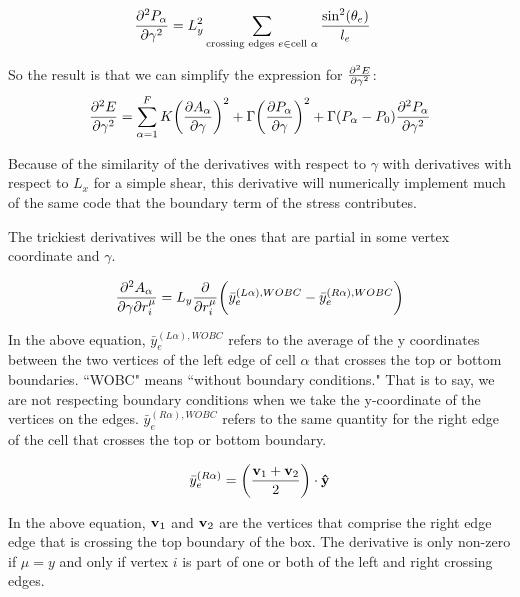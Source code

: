 \documentclass[12pt,a4paper]{article}
\begin{document}
\begin{align}
	\label{eqn: dPdgammadgamma}
	\pdv[2]{P_\alpha}{\gamma} &= L_y^2 \sum\limits_{ \text{crossing edges } e \in \text{cell } \alpha} \frac{\sin^2(\theta_{e})}{l_e}
\end{align}

So the result is that we can simplify the expression for $\pdv[2]{E}{\gamma}$:
\begin{align}
	\label{eqn: dedgammadgamma_simplified}
	\pdv[2]{E}{\gamma} &= \sum\limits_{\alpha=1}^{F}K \bigg(\pdv{A_\alpha}{\gamma}\bigg)^2  + \Gamma \bigg(\pdv{P_\alpha}{\gamma}\bigg)^2 + \Gamma (P_\alpha - P_0)  \pdv[2]{P_{\alpha}}{\gamma} \\
\end{align}

Because of the similarity of the derivatives with respect to $\gamma$ with derivatives with respect to $L_x$ for a simple shear, this derivative will numerically implement much of the same code that the boundary term of the stress contributes. 

The trickiest derivatives will be the ones that are partial in some vertex coordinate and $\gamma$. 

\begin{align}
	\label{eqn: dedgammadr}
	\pdv{A_{\alpha}}{\gamma}{r_i^\mu} = L_y \pdv{r_i^\mu}\bigg(\bar{y}_e^{(L\alpha), WOBC} - \bar{y}_e^{(R\alpha), WOBC}\bigg)
\end{align}

In the above equation, $\bar{y}_e^{(L\alpha),WOBC}$ refers to the average of the y coordinates between the two vertices of the left edge of cell $\alpha$ that crosses the top or bottom boundaries. ``WOBC" means ``without boundary conditions." That is to say, we are not respecting boundary conditions when we take the y-coordinate of the vertices on the edges.  $\bar{y}_e^{(R\alpha ), WOBC}$ refers to the same quantity for the right edge of  the cell that  crosses the top or bottom boundary. 

\begin{equation}
	\label{eqn: ybartop}
	\bar{y}_e^{(R\alpha)} = \bigg(\frac{\vb{v}_1 + \vb{v}_2}{2}\bigg)\cdot\vu{y}
\end{equation}

In the above equation, $\vb{v}_1$ and $\vb{v}_2$ are the vertices that comprise the right edge edge that is crossing the top boundary of the box. The derivative is only non-zero if $\mu = y$ and only if vertex $i$ is part of one or both of the left and right crossing edges.
\end{document}

